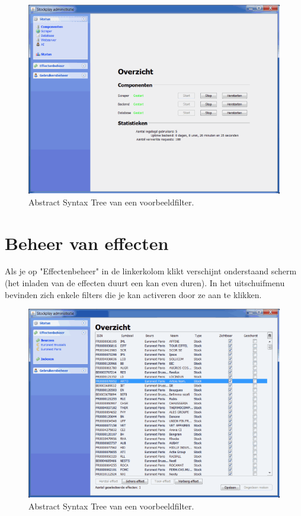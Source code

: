 \begin{figure}[h!]
	\centering
		\includegraphics[width=\textwidth]{images/handleiding/handleiding7.gif}
	\caption{Abstract Syntax Tree van een voorbeeldfilter.}
\end{figure}

\section{Beheer van effecten}

Als je op "Effectenbeheer" in de linkerkolom klikt verschijnt onderstaand scherm (het inladen van de effecten duurt een kan even duren).
In het uitschuifmenu bevinden zich enkele filters die je kan activeren door ze aan te klikken.

\begin{figure}[h!]
	\centering
		\includegraphics[width=\textwidth]{images/handleiding/handleiding6.gif}
	\caption{Abstract Syntax Tree van een voorbeeldfilter.}
\end{figure}

